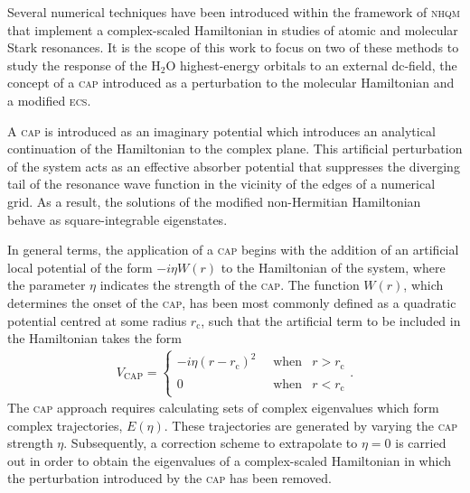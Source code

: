 Several numerical techniques have been introduced within the framework
of \textsc{nhqm} that implement a complex-scaled Hamiltonian in
studies of atomic and molecular Stark resonances. It is the scope of
this work to focus on two of these methods to study the response of
the H$_{2}$O highest-energy orbitals to an external dc-field, the
concept of a \textsc{cap} introduced as a perturbation to the
molecular Hamiltonian and a modified \textsc{ecs}.




A \textsc{cap} is introduced as an imaginary potential which
introduces an analytical continuation of the Hamiltonian to the
complex plane. This artificial perturbation of the system acts as an
effective absorber potential that suppresses the diverging tail of the
resonance wave function in the vicinity of the edges of a numerical
grid. As a result, the solutions of the modified non-Hermitian
Hamiltonian behave as square-integrable eigenstates.

In general terms, the application of a \textsc{cap} begins with the
addition of an artificial local potential of the form $-i \eta W(r)$
to the Hamiltonian of the system, where the parameter $\eta$ indicates
the strength of the \textsc{cap}. The function $W(r)$, which
determines the onset of the \textsc{cap}, has been most commonly
defined as a quadratic potential centred at some radius
$r_{\mathrm{c}}$, such that the artificial term to be included in the
Hamiltonian takes the form
%
\begin{eqnarray}
  V_{\mathrm{CAP}} = \left\{
  \begin{split}
    -i \eta (r - r_{\mathrm{c}})^{2} \
    & \mathrm{~when} & r > r_{\mathrm{c}} \\
    0 \phantom{i \eta_{\mathrm{c}}(r - r_{\mathrm{c}})^{2}} \
    & \mathrm{~when} &  r < r_{\mathrm{c}}
  \end{split}
  \right.
  .
\label{eq:VCAP}
\end{eqnarray}
%
The \textsc{cap} approach requires calculating sets of complex
eigenvalues which form complex trajectories, $E(\eta)$. These
trajectories are generated by varying the \textsc{cap} strength
$\eta$. Subsequently, a correction scheme to extrapolate to $\eta = 0$
is carried out in order to obtain the eigenvalues of a complex-scaled
Hamiltonian in which the perturbation introduced by the \textsc{cap}
has been removed.

